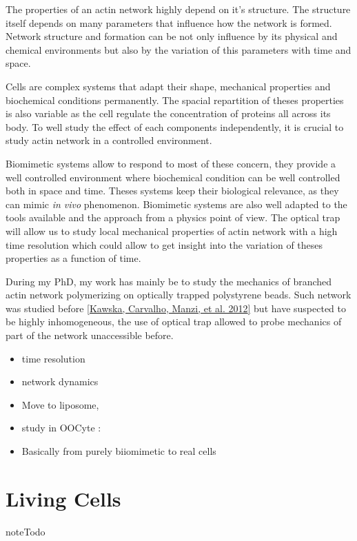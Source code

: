 \documentclass[A4paperpaper,11pt,english]{sphinxmanual}
\begin{document}
The properties of an actin network highly depend on it's structure. The
structure itself depends on many parameters that influence how the network is
formed. Network structure and formation can be not only influence by its
physical and chemical environments but also by the variation of this
parameters with time and space.

Cells are complex systems that adapt their shape, mechanical properties and
biochemical conditions permanently. The spacial repartition of theses
properties is also variable as the cell regulate the concentration of proteins
all across its body. To well study the effect of each components independently,
it is crucial to study actin network in a controlled environment.

Biomimetic systems allow to respond to most of these concern, they provide a
well controlled environment where biochemical condition can be well controlled
both in space and time. Theses systems keep their biological relevance, as they
can mimic \emph{in vivo} phenomenon. Biomimetic systems are also well adapted to the
tools available and the approach from a physics point of view. The optical trap
will allow us to study local mechanical properties of actin  network  with a
high time resolution which could allow to get insight into the variation of
theses properties as a function of time.

During my PhD, my work has mainly be to study the mechanics of branched actin
network polymerizing on optically trapped polystyrene beads. Such network was
studied before {\hyperref[bibitem:kawska2012]{{[}Kawska, Carvalho, Manzi,  et al.  2012{]}}}  but have suspected to be highly inhomogeneous,
the use of optical trap allowed to probe mechanics of part of the network
unaccessible before.
\begin{itemize}
\item {} 
time resolution

\item {} 
network dynamics

\item {} 
Move to liposome,

\item {} 
study in OOCyte :

\item {} 
Basically from purely biiomimetic to real cells

\end{itemize}


\section{Living Cells}
\label{parts/part1:living-cells}
\begin{notice}{note}{Todo}
\end{notice}
\end{document}
